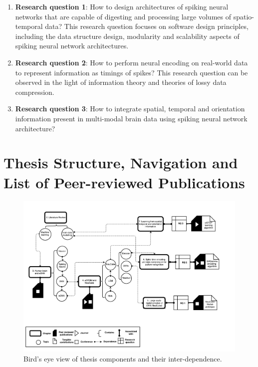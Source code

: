 \begin{enumerate}
	\item \textbf{Research question 1}: How to design architectures of spiking neural networks that are capable of digesting and processing large volumes of spatio-temporal data? This research question focuses on software design principles, including the data structure design, modularity and scalability aspects of spiking neural network architectures.
	\item \textbf{Research question 2}: How to perform neural encoding on real-world data to represent information as timings of spikes? This research question can be observed in the light of information theory and theories of lossy data compression. 
	\item \textbf{Research question 3}: How to integrate spatial, temporal and orientation information present in multi-modal brain data using spiking neural network architecture?  
\end{enumerate} 

\section{Thesis Structure, Navigation and List of Peer-reviewed Publications}
\begin{figure}
\centering
	\includegraphics[scale=0.8]{fig/intro/Navigation.pdf}
	\caption{Bird's eye view of thesis components and their inter-dependence.}
	\label{fig:birds_eye}
\end{figure}

